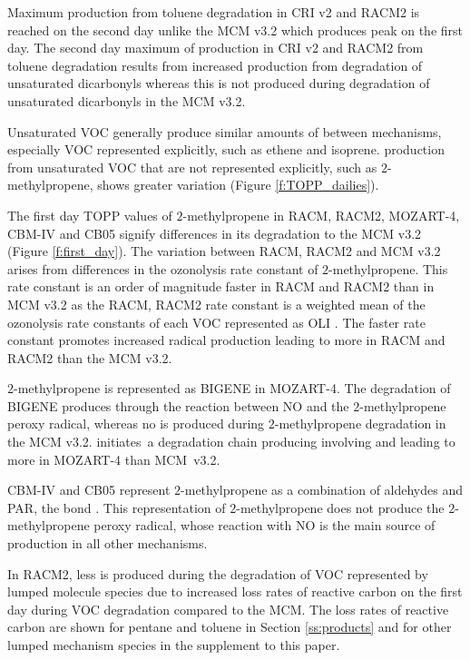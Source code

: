 Maximum  production from toluene degradation in CRI v2 and RACM2 is reached on the second day unlike the MCM v3.2 which produces peak  on the first day.
The second day maximum of  production in CRI v2 and RACM2 from toluene degradation results from increased  production from degradation of unsaturated dicarbonyls whereas this is not produced during degradation of unsaturated dicarbonyls in the MCM v3.2.

Unsaturated VOC generally produce similar amounts of  between mechanisms, especially VOC represented explicitly, such as ethene and isoprene.
 production from unsaturated VOC that are not represented explicitly, such as $2$-methylpropene, shows greater variation (Figure \ref{f:TOPP_dailies}).

The first day TOPP values of $2$-methylpropene in RACM, RACM2, MOZART-4, CBM-IV and CB05 signify differences in its degradation to the MCM v3.2 (Figure \ref{f:first_day}).
The variation between RACM, RACM2 and MCM v3.2 arises from differences in the ozonolysis rate constant of $2$-methylpropene.
This rate constant is an order of magnitude faster in RACM and RACM2 than in MCM v3.2 as the RACM, RACM2 rate constant is a weighted mean of the ozonolysis rate constants of each VOC represented as OLI \citep{Stockwell:1997, Goliff:2013}.
The faster rate constant promotes increased radical production leading to more  in RACM and RACM2 than the MCM v3.2.

$2$-methylpropene is represented as BIGENE in MOZART-4. 
The degradation of BIGENE produces  through the reaction between NO and the $2$-methylpropene peroxy radical, whereas no  is produced during $2$-methylpropene degradation in the MCM v3.2.
 \mbox{initiates a} degradation chain producing  involving  and  leading to more  in MOZART-4 than \mbox{MCM v3.2}.

CBM-IV and CB05 represent $2$-methylpropene as a combination of aldehydes and PAR, the  bond \citep{Gery:1989, Yarwood:2005}.
This representation of $2$-methylpropene does not produce the $2$-methylpropene peroxy radical, whose reaction with NO is the main source of  production in all other mechanisms.

In RACM2, less  is produced during the degradation of VOC represented by lumped molecule species due to increased loss rates of reactive carbon on the first day during VOC degradation compared to the MCM.
The loss rates of reactive carbon are shown for pentane and toluene in Section \ref{ss:products} and for other lumped mechanism species in the supplement to this paper.

